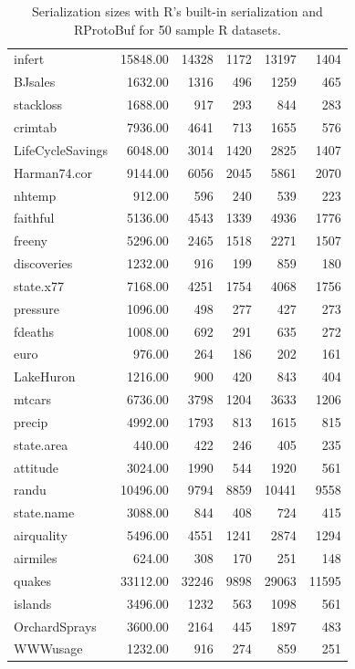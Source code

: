 \documentclass[article]{jss}
\begin{document}
\begin{table}[h!]
\begin{center}
{\begin{tabular}{l|r|r|r|r|r}
  infert & 15848.00 & 14328 & 1172 & 13197 & 1404 \\
  BJsales & 1632.00 & 1316 & 496 & 1259 & 465 \\
  stackloss & 1688.00 & 917 & 293 & 844 & 283 \\
  crimtab & 7936.00 & 4641 & 713 & 1655 & 576 \\
  LifeCycleSavings & 6048.00 & 3014 & 1420 & 2825 & 1407 \\
  Harman74.cor & 9144.00 & 6056 & 2045 & 5861 & 2070 \\
  nhtemp & 912.00 & 596 & 240 & 539 & 223 \\
  faithful & 5136.00 & 4543 & 1339 & 4936 & 1776 \\
  freeny & 5296.00 & 2465 & 1518 & 2271 & 1507 \\
  discoveries & 1232.00 & 916 & 199 & 859 & 180 \\
  state.x77 & 7168.00 & 4251 & 1754 & 4068 & 1756 \\
  pressure & 1096.00 & 498 & 277 & 427 & 273 \\
  fdeaths & 1008.00 & 692 & 291 & 635 & 272 \\
  euro & 976.00 & 264 & 186 & 202 & 161 \\
  LakeHuron & 1216.00 & 900 & 420 & 843 & 404 \\
  mtcars & 6736.00 & 3798 & 1204 & 3633 & 1206 \\
  precip & 4992.00 & 1793 & 813 & 1615 & 815 \\
  state.area & 440.00 & 422 & 246 & 405 & 235 \\
  attitude & 3024.00 & 1990 & 544 & 1920 & 561 \\
  randu & 10496.00 & 9794 & 8859 & 10441 & 9558 \\
  state.name & 3088.00 & 844 & 408 & 724 & 415 \\
  airquality & 5496.00 & 4551 & 1241 & 2874 & 1294 \\
  airmiles & 624.00 & 308 & 170 & 251 & 148 \\
  quakes & 33112.00 & 32246 & 9898 & 29063 & 11595 \\
  islands & 3496.00 & 1232 & 563 & 1098 & 561 \\
  OrchardSprays & 3600.00 & 2164 & 445 & 1897 & 483 \\
  WWWusage & 1232.00 & 916 & 274 & 859 & 251 \\
   \hline
\end{tabular}
}
\caption{Serialization sizes with R's built-in serialization and
  RProtoBuf for 50 sample R datasets.}
\label{tab:compression}
\end{center}
\end{table}
\end{document}
